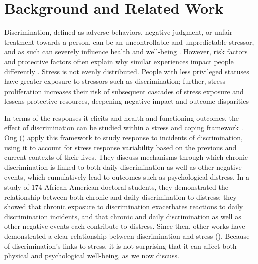 \section{Background and Related Work}
\label{sec:back}

\label{sec:back-discrimination}
\noindent 
Discrimination, defined as adverse behaviors, negative judgment, or unfair treatment towards a person, can be an uncontrollable and unpredictable stressor, and as such can severely influence health and well-being \citep{Williams:2009}. However, risk factors and protective factors often explain why similar experiences impact people differently \citep{SeridoAlmeidaWethington:2004}.  Stress is not evenly distributed. People with less privileged statuses have  greater exposure to stressors such as discrimination; further, stress proliferation increases their risk of subsequent cascades of stress exposure and  lessens protective resources, deepening negative impact and outcome disparities \citep{Pearlin:2005}

In terms of the responses it elicits and  health and functioning outcomes, the effect of discrimination can be studied within a stress and coping framework \citep{Pearlin:1999}. Ong \etal (\citeyear{Ong:2009}) apply this framework to  study  response to incidents of discrimination, using it to account for stress response variability based on the previous and current contexts of their lives. They discuss mechanisms through which chronic discrimination is linked to both daily discrimination as well as other negative events, which cumulatively lead to outcomes such as psychological distress. In a  study of  174 African American doctoral students, they demonstrated the relationship between both chronic and daily discrimination to distress; they showed that chronic exposure to discrimination exacerbates reactions to daily discrimination incidents, and that chronic and daily discrimination as well as other negative events each contribute to distress. Since then, other works have demonstrated a clear relationship between discrimination and stress (\eg \cite{Pieterse:2007}).  
Because of discrimination's links to stress, it is not surprising that it can affect both physical and psychological well-being, as we now discuss.

